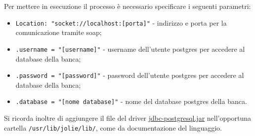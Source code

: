 \documentclass[11pt]{article} %
\begin{document}
Per mettere in esecuzione il processo è necessario specificare i seguenti parametri:
\begin{itemize}
\item \verb|Location: "socket://localhost:[porta]"| - indirizzo e porta per la comunicazione tramite soap;
\item \verb|.username = "[username]"| - username dell'utente postgres per accedere al database della banca;
\item \verb|.password = "[password]"| - password dell'utente postgres per accedere al database della banca;
\item \verb|.database = "[nome database]"| - nome del database postgres della banca.
\end{itemize}
Si ricorda inoltre di aggiungere il file del driver \href{https://jdbc.postgresql.org/}{jdbc-postgresql.jar} nell'opportuna cartella \verb|/usr/lib/jolie/lib/|, come da documentazione del linguaggio.
\end{document}
